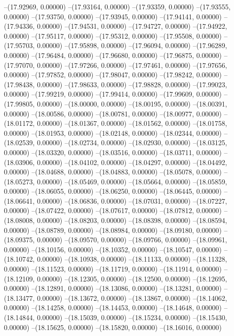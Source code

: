 --(17.92969, 0.00000)
--(17.93164, 0.00000)
--(17.93359, 0.00000)
--(17.93555, 0.00000)
--(17.93750, 0.00000)
--(17.93945, 0.00000)
--(17.94141, 0.00000)
--(17.94336, 0.00000)
--(17.94531, 0.00000)
--(17.94727, 0.00000)
--(17.94922, 0.00000)
--(17.95117, 0.00000)
--(17.95312, 0.00000)
--(17.95508, 0.00000)
--(17.95703, 0.00000)
--(17.95898, 0.00000)
--(17.96094, 0.00000)
--(17.96289, 0.00000)
--(17.96484, 0.00000)
--(17.96680, 0.00000)
--(17.96875, 0.00000)
--(17.97070, 0.00000)
--(17.97266, 0.00000)
--(17.97461, 0.00000)
--(17.97656, 0.00000)
--(17.97852, 0.00000)
--(17.98047, 0.00000)
--(17.98242, 0.00000)
--(17.98438, 0.00000)
--(17.98633, 0.00000)
--(17.98828, 0.00000)
--(17.99023, 0.00000)
--(17.99219, 0.00000)
--(17.99414, 0.00000)
--(17.99609, 0.00000)
--(17.99805, 0.00000)
--(18.00000, 0.00000)
--(18.00195, 0.00000)
--(18.00391, 0.00000)
--(18.00586, 0.00000)
--(18.00781, 0.00000)
--(18.00977, 0.00000)
--(18.01172, 0.00000)
--(18.01367, 0.00000)
--(18.01562, 0.00000)
--(18.01758, 0.00000)
--(18.01953, 0.00000)
--(18.02148, 0.00000)
--(18.02344, 0.00000)
--(18.02539, 0.00000)
--(18.02734, 0.00000)
--(18.02930, 0.00000)
--(18.03125, 0.00000)
--(18.03320, 0.00000)
--(18.03516, 0.00000)
--(18.03711, 0.00000)
--(18.03906, 0.00000)
--(18.04102, 0.00000)
--(18.04297, 0.00000)
--(18.04492, 0.00000)
--(18.04688, 0.00000)
--(18.04883, 0.00000)
--(18.05078, 0.00000)
--(18.05273, 0.00000)
--(18.05469, 0.00000)
--(18.05664, 0.00000)
--(18.05859, 0.00000)
--(18.06055, 0.00000)
--(18.06250, 0.00000)
--(18.06445, 0.00000)
--(18.06641, 0.00000)
--(18.06836, 0.00000)
--(18.07031, 0.00000)
--(18.07227, 0.00000)
--(18.07422, 0.00000)
--(18.07617, 0.00000)
--(18.07812, 0.00000)
--(18.08008, 0.00000)
--(18.08203, 0.00000)
--(18.08398, 0.00000)
--(18.08594, 0.00000)
--(18.08789, 0.00000)
--(18.08984, 0.00000)
--(18.09180, 0.00000)
--(18.09375, 0.00000)
--(18.09570, 0.00000)
--(18.09766, 0.00000)
--(18.09961, 0.00000)
--(18.10156, 0.00000)
--(18.10352, 0.00000)
--(18.10547, 0.00000)
--(18.10742, 0.00000)
--(18.10938, 0.00000)
--(18.11133, 0.00000)
--(18.11328, 0.00000)
--(18.11523, 0.00000)
--(18.11719, 0.00000)
--(18.11914, 0.00000)
--(18.12109, 0.00000)
--(18.12305, 0.00000)
--(18.12500, 0.00000)
--(18.12695, 0.00000)
--(18.12891, 0.00000)
--(18.13086, 0.00000)
--(18.13281, 0.00000)
--(18.13477, 0.00000)
--(18.13672, 0.00000)
--(18.13867, 0.00000)
--(18.14062, 0.00000)
--(18.14258, 0.00000)
--(18.14453, 0.00000)
--(18.14648, 0.00000)
--(18.14844, 0.00000)
--(18.15039, 0.00000)
--(18.15234, 0.00000)
--(18.15430, 0.00000)
--(18.15625, 0.00000)
--(18.15820, 0.00000)
--(18.16016, 0.00000)
